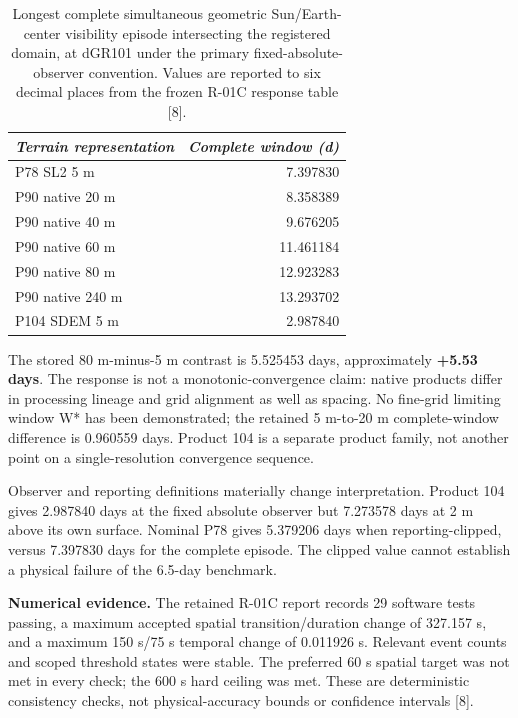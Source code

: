\documentclass[conference,letterpaper]{IEEEtran}
\begin{document}
\begin{table}[!t]\centering
\caption{Longest complete simultaneous geometric Sun/Earth-center visibility episode intersecting the registered domain, at dGR101 under the primary fixed-absolute-observer convention. Values are reported to six decimal places from the frozen R-01C response table [8].}
\label{tab:result1}
\small\setlength{\tabcolsep}{6pt}\renewcommand{\arraystretch}{1.12}
\begin{tabular}{@{}lr@{}}\toprule
\textit{Terrain representation} & \textit{Complete window (d)}\\\midrule
P78 SL2 5 m & 7.397830\\
P90 native 20 m & 8.358389\\
P90 native 40 m & 9.676205\\
P90 native 60 m & 11.461184\\
P90 native 80 m & 12.923283\\
P90 native 240 m & 13.293702\\
P104 SDEM 5 m & 2.987840\\
\bottomrule\end{tabular}
\end{table}

The stored 80 m-minus-5 m contrast is 5.525453 days, approximately \textbf{+5.53 days}. The response is not a monotonic-convergence claim: native products differ in processing lineage and grid alignment as well as spacing. No fine-grid limiting window W* has been demonstrated; the retained 5 m-to-20 m complete-window difference is 0.960559 days. Product 104 is a separate product family, not another point on a single-resolution convergence sequence.

Observer and reporting definitions materially change interpretation. Product 104 gives 2.987840 days at the fixed absolute observer but 7.273578 days at 2 m above its own surface. Nominal P78 gives 5.379206 days when reporting-clipped, versus 7.397830 days for the complete episode. The clipped value cannot establish a physical failure of the 6.5-day benchmark.

\textbf{Numerical evidence.} The retained R-01C report records 29 software tests passing, a maximum accepted spatial transition/duration change of 327.157 s, and a maximum 150 s/75 s temporal change of 0.011926 s. Relevant event counts and scoped threshold states were stable. The preferred 60 s spatial target was not met in every check; the 600 s hard ceiling was met. These are deterministic consistency checks, not physical-accuracy bounds or confidence intervals [8].
\end{document}
